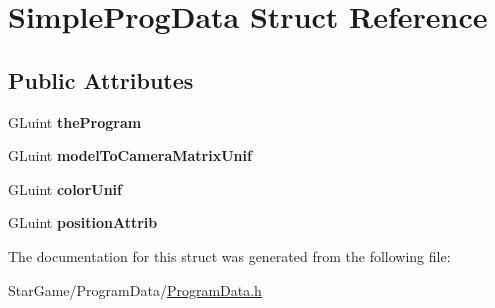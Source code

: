 \hypertarget{struct_simple_prog_data}{\section{Simple\-Prog\-Data Struct Reference}
\label{struct_simple_prog_data}
}
\subsection*{Public Attributes}
\begin{DoxyCompactItemize}
\item 
\hypertarget{struct_simple_prog_data_a41517520b43c4004cdd5ce54808cb16f}{G\-Luint {\bfseries the\-Program}}\label{struct_simple_prog_data_a41517520b43c4004cdd5ce54808cb16f}

\item 
\hypertarget{struct_simple_prog_data_af3762875fe824a9819c40a8417c95326}{G\-Luint {\bfseries model\-To\-Camera\-Matrix\-Unif}}\label{struct_simple_prog_data_af3762875fe824a9819c40a8417c95326}

\item 
\hypertarget{struct_simple_prog_data_adde2038a4b5a23ddf3b024f4d7677229}{G\-Luint {\bfseries color\-Unif}}\label{struct_simple_prog_data_adde2038a4b5a23ddf3b024f4d7677229}

\item 
\hypertarget{struct_simple_prog_data_ae9102cadfc8f3e0f448c4560bfc8d9da}{G\-Luint {\bfseries position\-Attrib}}\label{struct_simple_prog_data_ae9102cadfc8f3e0f448c4560bfc8d9da}

\end{DoxyCompactItemize}


The documentation for this struct was generated from the following file\-:\begin{DoxyCompactItemize}
\item 
Star\-Game/\-Program\-Data/\hyperlink{_program_data_8h}{Program\-Data.\-h}\end{DoxyCompactItemize}
